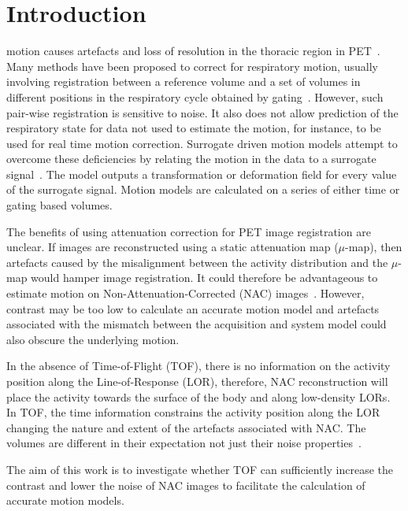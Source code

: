 \documentclass{IEEEtran}
\begin{document}
\vspace{-0.4cm}

\section*{Introduction}
 motion causes artefacts and loss of resolution in the thoracic region in PET~\cite{Nehmeh2008}. Many methods have been proposed to correct for respiratory motion, usually involving registration between a reference volume and a set of volumes in different positions in the respiratory cycle obtained by gating~\cite{Oliveira2014}. However, such pair-wise registration is sensitive to noise. It also does not allow prediction of the respiratory state for data not used to estimate the motion, for instance, to be used for real time motion correction. Surrogate driven motion models attempt to overcome these deficiencies by relating the motion in the data to a surrogate signal~\cite{McClelland2013}. The model outputs a transformation or deformation field for every value of the surrogate signal. Motion models are calculated on a series of either time or gating based volumes.

The benefits of using attenuation correction for PET image registration are unclear. If images are reconstructed using a static attenuation map ($\mu$-map), then artefacts caused by the misalignment between the activity distribution and the $\mu$-map would hamper image registration. It could therefore be advantageous to estimate motion on Non-Attenuation-Corrected (NAC) images~\cite{WenjiaBai2011}. However, contrast may be too low to calculate an accurate motion model and artefacts associated with the mismatch between the acquisition and system model could also obscure the underlying motion. 

In the absence of Time-of-Flight (TOF), there is no information on the activity position along the Line-of-Response (LOR), therefore, NAC reconstruction will place the activity towards the surface of the body and along low-density LORs. In TOF, the time information constrains the activity position along the LOR changing the nature and extent of the artefacts associated with NAC. The volumes are different in their expectation not just their noise properties~\cite{Ter-Pogossian1981}.

The aim of this work is to investigate whether TOF can sufficiently increase the contrast and lower the noise of NAC images to facilitate the calculation of accurate motion models.
\end{document}
